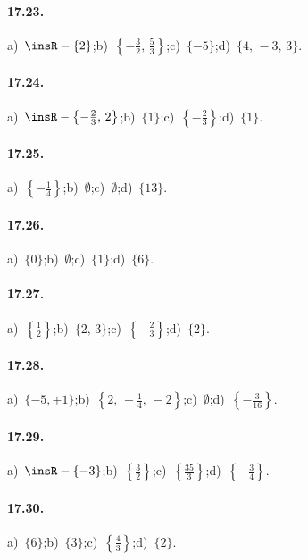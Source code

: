 \paragraph{17.23.}
a)~$\insR-\{2\}$;\quad b)~$\left\{-{\frac{3}{2}}\text{,~}\frac{5}{3}\right\}$;\quad c)~$\{-5\}$;\quad d)~$\{4\text{,~}-3\text{,~}3\}$.

\paragraph{17.24.}
a)~$\insR-\left\{-{\frac{2}{3}}\text{,~}2\right\}$;\quad b)~$\{1\}$;\quad c)~$\left\{-{\frac{2}{3}}\right\}$;\quad d)~$\{1\}$.

\paragraph{17.25.}
a)~$\left\{-{\frac{1}{4}}\right\}$;\quad b)~$\emptyset$;\quad c)~$\emptyset$;\quad d)~$\{13\}$.

\paragraph{17.26.}
a)~$\{0\}$;\quad b)~$\emptyset$;\quad c)~$\{1\}$;\quad d)~$\{6\}$.

\paragraph{17.27.}
a)~$\left\{\frac{1}{2}\right\}$;\quad b)~$\{2\text{,~}3\}$;\quad c)~$\left\{-\frac{2}{3}\right\}$;\quad d)~$\{2\}$.

\paragraph{17.28.}
a)~$\{-5,+1\}$;\quad b)~$\left\{2\text{,~}-\frac{1}{4}\text{,~}-2\right\}$;\quad c)~$\emptyset$;\quad d)~$\left\{-{\frac{3}{16}}\right\}$.

\paragraph{17.29.}
a)~$\insR-\{-3\}$;\quad b)~$\left\{\frac{3}{2}\right\}$;\quad c)~$\left\{\frac{35}{3}\right\}$;\quad d)~$\left\{-{\frac{3}{4}}\right\}$.

\paragraph{17.30.}
a)~$\{6\}$;\quad b)~$\{3\}$;\quad c)~$\left\{\frac{4}{3}\right\}$;\quad d)~$\{2\}$.

